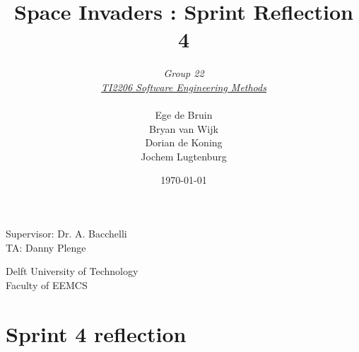 \documentclass[10pt]{article}
\begin{document}
\title{Space Invaders : Sprint Reflection 4}
\date{\today}
\author{\textit{Group 22}\\ \textit{\underline{TI2206 Software Engineering Methods}} \\
 \\Ege de Bruin \\ Bryan van Wijk \\ Dorian de Koning \\ Jochem Lugtenburg }
 \maketitle  
 \begin{center}
Supervisor: Dr. A. Bacchelli\\
TA: Danny Plenge\\
 \end{center}     
 \begin{center}
 Delft University of Technology\\
 Faculty of EEMCS\\
 \end{center}
 \thispagestyle{empty}
 \pagebreak

\section*{Sprint 4 reflection}
\end{document}
